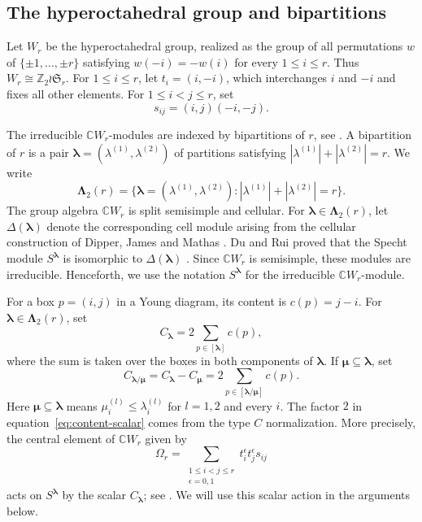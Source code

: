 \documentclass[10pt,a4paper]{amsart}
\newcommand{\Z}{\mathbb{Z}}
\newcommand{\C}{\mathbb{C}}
\newcommand{\1}{\mathfrak{1}}
\newcommand{\Sg}{\mathfrak{S}}
\begin{document}
\subsection{The hyperoctahedral group and bipartitions}

Let $W_r$ be the hyperoctahedral group, realized as the
group of all permutations $w$ of $\{\pm1,\ldots,\pm r\}$
satisfying $w(-i)=-w(i)$ for every $1\leq i\leq r$.
Thus $W_r\cong\Z_2\wr\Sg_r$. For $1\leq i\leq r$,
let $t_i=(i,-i)$, which interchanges $i$ and $-i$
and fixes all other elements. For $1\leq i<j\leq r$,
set
$$
s_{ij}=(i,j)(-i,-j).
$$

The irreducible $\C W_r$-modules are indexed by bipartitions of $r$, see \cite{AK94,Ma99}. A bipartition of $r$ is a pair $\bm\lambda=(\lambda^{(1)},\lambda^{(2)})$ of partitions satisfying $|\lambda^{(1)}|+|\lambda^{(2)}|=r$. We write
$$
 \bm\Lambda_2(r)= \{\bm\lambda=(\lambda^{(1)},\lambda^{(2)}): |\lambda^{(1)}|+|\lambda^{(2)}|=r\}.
$$
The group algebra $\C W_r$ is split semisimple and cellular. For $\bm\lambda\in\bm\Lambda_2(r)$, let $\Delta(\bm\lambda)$ denote the corresponding cell module arising from the cellular construction of Dipper, James and Mathas \cite{DJM98}. Du and Rui proved that the Specht module $S^{\bm\lambda}$ is isomorphic to $\Delta(\bm\lambda)$ \cite{DR01}. Since $\C W_r$ is semisimple, these modules are irreducible. Henceforth, we use the notation $S^{\bm\lambda}$ for the irreducible $\C W_r$-module. 

For a box $p=(i,j)$ in a Young diagram, its content is $ c(p)=j-i$. For $\bm\lambda\in\bm\Lambda_2(r)$, set
\begin{equation}
 C_{\bm\lambda}=2\sum_{p\in[\bm\lambda]}c(p),
 \label{eq:content-scalar}
\end{equation}
where the sum is taken over the boxes in both components of $\bm\lambda$. If $\bm\mu\subseteq\bm\lambda$, set
\begin{equation}
 C_{\bm\lambda/\bm\mu} = C_{\bm\lambda}-C_{\bm\mu} = 2\sum_{p\in[\bm\lambda/\bm\mu]}c(p).
 \label{eq:skew-content}
\end{equation}
Here $\bm\mu\subseteq\bm\lambda$ means
$\mu_i^{(l)}\leq\lambda_i^{(l)}$ for $l=1,2$ and every $i$. The factor $2$ in equation~\eqref{eq:content-scalar} comes from the type $C$ normalization. More precisely, the central element of $\C W_r$ given by
$$
\Omega_r= \sum_{\substack{1\leq i<j\leq r\\ \epsilon=0,1}} t_i^\epsilon t_j^\epsilon s_{ij}
$$
acts on $S^{\bm\lambda}$ by the scalar $C_{\bm\lambda}$; see \cite[Proposition~8.4]{RY04}. We will use this scalar action in the arguments below.
\end{document}

